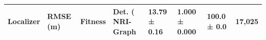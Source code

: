 \begin{tabular}{lllll}
\toprule
Localizer & RMSE (m) & Fitness & Det. (%
\midrule
NRI-Graph & 13.79 ± 0.16 & 1.000 ± 0.000 & 100.0 ± 0.0 & 17,025 \\
\bottomrule
\end{tabular}

